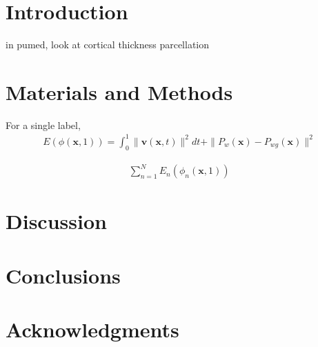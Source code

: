 \documentclass[preprint,authoryear,review,12pt]{elsarticle}
\begin{document}
\section{Introduction}

in pumed, look at cortical thickness parcellation

\section{Materials and Methods}

For a single label,
\begin{align}
  E(\phi(\mathbf{x},1)) = \int_0^1 \|\mathbf{v}(\mathbf{x},t)\|^2 dt +
      \|P_w(\mathbf{x}) -P_{wg}(\mathbf{x})\|^2
\end{align}

\begin{align}
  \sum_{n=1}^N E_{n}(\phi_n(\mathbf{x},1))
\end{align}


\section{Discussion} 

\section{Conclusions}





\section*{Acknowledgments}
\end{document}
